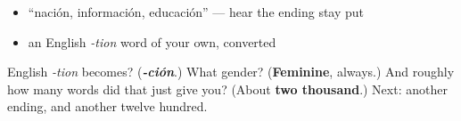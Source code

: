 \begin{itemize}
\raggedright
  \item \textquotedblleft{}nación, información, educación\textquotedblright{} — hear the ending stay put
  \item an English \emph{-tion} word of your own, converted
\end{itemize}

\begin{tcolorbox}[breakable,colback=teal!4,colframe=teal!35!black,title={Before you move on}]
English \emph{-tion} becomes? (\emph{\textbf{-ción}}.) What gender? (\textbf{Feminine}, always.) And roughly how many words did that just give you? (About \textbf{two thousand}.) Next: another ending, and another twelve hundred.
\end{tcolorbox}
